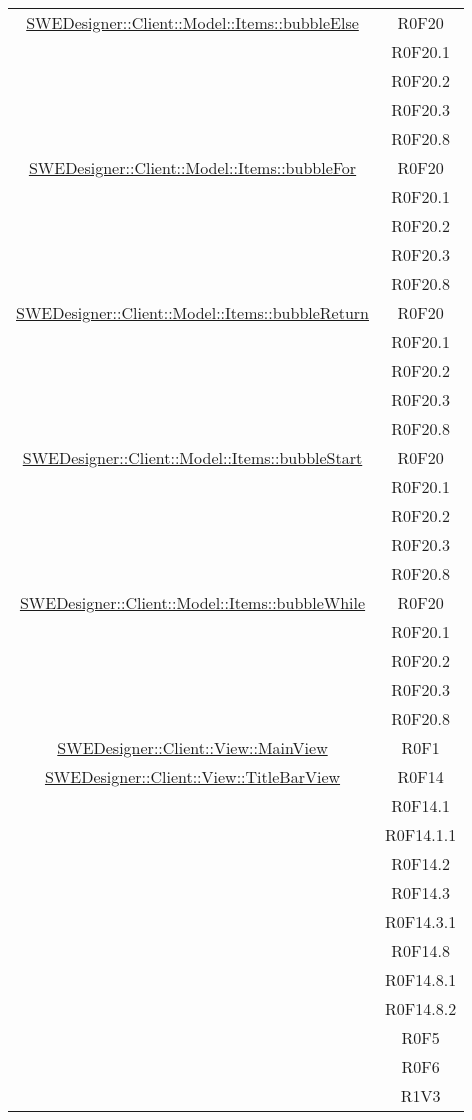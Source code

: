 \documentclass[../DefinizioneDiProdotto.tex]{subfiles}
\begin{document}
\begin{longtable}{|c|c|}
				\hyperlink{SWEDesigner::Client::Model::Items::bubbleElse}{SWEDesigner::Client::Model::Items::bubbleElse}
				& R0F20\\
				& R0F20.1\\
				& R0F20.2\\
				& R0F20.3\\
				& R0F20.8\\
				\hline

				\hyperlink{SWEDesigner::Client::Model::Items::bubbleFor}{SWEDesigner::Client::Model::Items::bubbleFor}
				& R0F20\\
				& R0F20.1\\
				& R0F20.2\\
				& R0F20.3\\
				& R0F20.8\\
				\hline

				\hyperlink{SWEDesigner::Client::Model::Items::bubbleReturn}{SWEDesigner::Client::Model::Items::bubbleReturn}
				& R0F20\\
				& R0F20.1\\
				& R0F20.2\\
				& R0F20.3\\
				& R0F20.8\\
				\hline

				\hyperlink{SWEDesigner::Client::Model::Items::bubbleStart}{SWEDesigner::Client::Model::Items::bubbleStart}
				& R0F20\\
				& R0F20.1\\
				& R0F20.2\\
				& R0F20.3\\
				& R0F20.8\\
				\hline

				\hyperlink{SWEDesigner::Client::Model::Items::bubbleWhile}{SWEDesigner::Client::Model::Items::bubbleWhile}
				& R0F20\\
				& R0F20.1\\
				& R0F20.2\\
				& R0F20.3\\
				& R0F20.8\\
				\hline

				\hyperlink{SWEDesigner::Client::View::MainView}{SWEDesigner::Client::View::MainView}
				& R0F1\\
				\hline

				\hyperlink{SWEDesigner::Client::View::TitleBarView}{SWEDesigner::Client::View::TitleBarView}
				& R0F14\\
				& R0F14.1\\
				& R0F14.1.1\\
				& R0F14.2\\
				& R0F14.3\\
				& R0F14.3.1\\
				& R0F14.8\\
				& R0F14.8.1\\
				& R0F14.8.2\\
				& R0F5\\
				& R0F6\\
				& R1V3\\
				\hline


\end{longtable}
\end{document}
